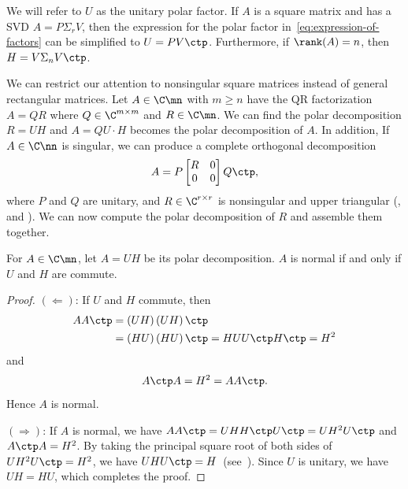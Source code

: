 \documentclass{article}
\numberwithin{equation}{section} %
\begin{document}
We will refer to $U$ as the unitary polar factor. If $A$ is a square matrix
and has a SVD $A = P\Sigma_r V$, then the expression for the polar factor
in~\eqref{eq:expression-of-factors} can be simplified to $U = PV\ctp$.
Furthermore, if $\rank(A) = n$, then $H = V\Sigma_n V\ctp$.

We can restrict our attention to nonsingular square matrices instead of
general rectangular matrices. Let $A\in\C\mn$ with $m\geq n$ have the QR
factorization $A = QR$ where $Q\in\C^{m\times m}$ and $R\in \C\mn$. We can
find the polar decomposition $R = UH$ and $A = QU \cdot H$ becomes the
polar decomposition of $A$. In addition, If $A\in\C\nn$ is singular, we can
produce a complete orthogonal decomposition
\begin{equation}
  A = P
  \begin{bmatrix}
    R & 0 \\ 0 & 0
  \end{bmatrix}
  Q\ctp,
\end{equation}
where $P$ and $Q$ are unitary, and $R\in\C^{r\times r}$ is nonsingular and
upper triangular (,  and ). We can now compute the polar
decomposition of $R$ and assemble them together.


\begin{theorem}
For $A\in\C\mn$, let $A = UH$ be its polar decomposition. $A$ is normal if
and only if $U$ and $H$ are commute.
\end{theorem}

\begin{proof}
$(\Leftarrow)$: If $U$ and $H$ commute, then
\begin{equation}
  \notag
  \begin{aligned}
    AA\ctp &= \left(UH\right)\left(UH\right)\ctp\\
           & = \left(HU\right)\left(HU\right)\ctp = HUU\ctp H\ctp = H^2 \\
  \end{aligned}
\end{equation}
and
\begin{equation*}
A\ctp A = H^2 = AA\ctp.
\end{equation*}
Hence $A$ is normal.

$(\Rightarrow)$: If $A$ is normal, we have
$AA\ctp = UHH\ctp U\ctp=UH^2U\ctp$ and $A\ctp A = H^2$. By taking the
principal square root of both sides of $UH^2 U\ctp = H^2$, we have
$UHU\ctp = H$~(see~).
Since $U$ is unitary, we have $UH = HU$, which completes the proof.
\end{proof}
\end{document}
